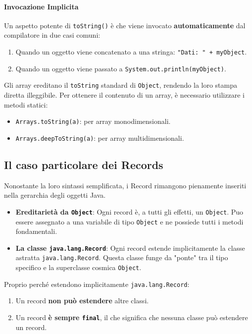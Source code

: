 \paragraph{Invocazione Implicita}
Un aspetto potente di \texttt{toString()} è che viene invocato \textbf{automaticamente} dal compilatore in due casi comuni:
\begin{enumerate}
    \item Quando un oggetto viene concatenato a una stringa: \texttt{"Dati: " + myObject}.
    \item Quando un oggetto viene passato a \texttt{System.out.println(myObject)}.
\end{enumerate}

\begin{observation}
    Gli array ereditano il \texttt{toString} standard di \texttt{Object}, rendendo la loro stampa diretta illeggibile. Per ottenere il contenuto di un array, è necessario utilizzare i metodi statici:
    \begin{itemize}
        \item \texttt{Arrays.toString(a)}: per array monodimensionali.
        \item \texttt{Arrays.deepToString(a)}: per array multidimensionali.
    \end{itemize}
\end{observation}

\subsection{Il caso particolare dei Records}

Nonostante la loro sintassi semplificata, i Record rimangono pienamente inseriti nella gerarchia degli oggetti Java.

\begin{itemize}
    \item \textbf{Ereditarietà da \texttt{Object}}: Ogni record è, a tutti gli effetti, un \texttt{Object}. Puo essere assegnato a una variabile di tipo \texttt{Object} e ne possiede tutti i metodi fondamentali.
    \item \textbf{La classe \texttt{java.lang.Record}}: Ogni record estende implicitamente la classe astratta \texttt{java.lang.Record}. Questa classe funge da "ponte" tra il tipo specifico e la superclasse cosmica \texttt{Object}.
\end{itemize} \vspace{\baselineskip}

Proprio perché estendono implicitamente \texttt{java.lang.Record}:
\begin{enumerate}
    \item Un record \textbf{non può estendere} altre classi.
    \item Un record \textbf{è sempre \texttt{final}}, il che significa che nessuna classe può estendere un record.
\end{enumerate} \vspace{\baselineskip}

